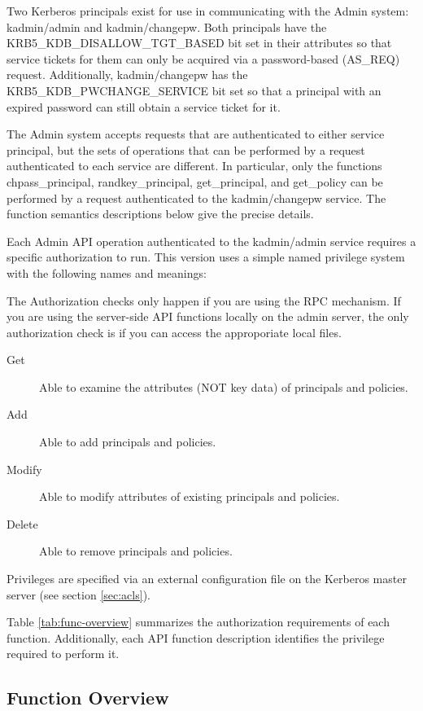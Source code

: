 Two Kerberos principals exist for use in communicating with the Admin
system: kadmin/admin and kadmin/changepw.  Both principals
have the KRB5_KDB_DISALLOW_TGT_BASED bit set in their attributes so
that service tickets for them can only be acquired via a
password-based (AS_REQ) request.  Additionally, kadmin/changepw
has the KRB5_KDB_PWCHANGE_SERVICE bit set so that a principal with an
expired password can still obtain a service ticket for it.

The Admin system accepts requests that are authenticated to either
service principal, but the sets of operations that can be performed by
a request authenticated to each service are different.  In particular,
only the functions chpass_principal, randkey_principal, get_principal,
and get_policy can be performed by a request authenticated to the
kadmin/changepw service.  The function semantics descriptions below
give the precise details.

Each Admin API operation authenticated to the kadmin/admin service
requires a specific authorization to run.  This version uses a simple
named privilege system with the following names and meanings:

The Authorization checks only happen if you are using the RPC mechanism.
If you are using the server-side API functions locally on the admin server,
the only authorization check is if you can access the approporiate local
files. 

\begin{description}
\item[Get] Able to examine the attributes (NOT key data) of principals
and policies. 
\item[Add] Able to add principals and policies.
\item[Modify] Able to modify attributes of existing principals and policies.
\item[Delete] Able to remove principals and policies.
\end{description}

Privileges are specified via an external configuration file on the
Kerberos master server (see section \ref{sec:acls}).

Table \ref{tab:func-overview} summarizes the authorization
requirements of each function.  Additionally, each API function
description identifies the privilege required to perform it.

\subsection{Function Overview}

